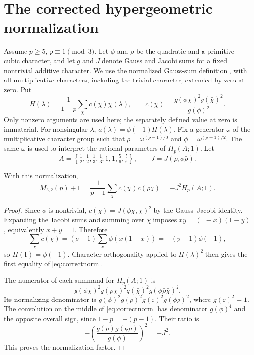 \section{The corrected hypergeometric normalization}\label{sec:hyp}
Assume $p\ge5$, $p\equiv1\pmod3$. Let $\phi$ and $\rho$ be the quadratic and a primitive cubic character, and let $g$ and $J$ denote Gauss and Jacobi sums for a fixed nontrivial additive character. We use the normalized Gauss-sum definition
\cite[Eq. (1.1)]{Grove}, with all multiplicative characters, including
the trivial character, extended by zero at zero. Put
\[
 H(\lambda)=\frac1{1-p}\sum_\chi c(\chi)\chi(\lambda),
 \qquad c(\chi)=\frac{g(\phi\chi)^2g(\bar\chi)^2}{g(\phi)^2}.
\]
Only nonzero arguments are used here; the separately defined value at zero is immaterial. For nonsingular $\lambda$, $a(\lambda)=\phi(-1)H(\lambda)$.
Fix a generator $\omega$ of the multiplicative character group such that $\rho=\omega^{(p-1)/3}$ and $\phi=\omega^{(p-1)/2}$. The same $\omega$ is used to interpret the rational parameters of $H_p(A;1)$. Let
\[
 A=\left\{\tfrac12,\tfrac12,\tfrac13,\tfrac13;
               1,1,\tfrac56,\tfrac56\right\},\qquad
 J=J(\rho,\phi\bar\rho).
\]
\begin{lemma}\label{lem:norm}
With this normalization,
\begin{equation}\label{eq:correctnorm}
 M_{3,2}(p)+1
 =\frac1{p-1}\sum_\chi c(\chi)c(\bar\rho\bar\chi)
 =-J^2 H_p(A;1).
\end{equation}
\end{lemma}
\begin{proof}
Since $\phi$ is nontrivial,
$c(\chi)=J(\phi\chi,\bar\chi)^2$ by the Gauss--Jacobi identity.
Expanding the Jacobi sums and summing over $\chi$ imposes
$xy=(1-x)(1-y)$, equivalently $x+y=1$. Therefore
\[
 \sum_\chi c(\chi)=(p-1)\sum_x\phi(x(1-x))
 =-(p-1)\phi(-1),
\]
so $H(1)=\phi(-1)$. Character orthogonality applied to $H(\lambda)^2$
then gives the first equality of \eqref{eq:correctnorm}.

The numerator of each summand for $H_p(A;1)$ is
\[
 g(\phi\chi)^2g(\rho\chi)^2g(\bar\chi)^2
                  g(\phi\bar\rho\bar\chi)^2.
\]
Its normalizing denominator is
$g(\phi)^2g(\rho)^2g(\varepsilon)^2g(\phi\bar\rho)^2$,
where $g(\varepsilon)^2=1$. The convolution on the middle of
\eqref{eq:correctnorm} has denominator $g(\phi)^4$ and the opposite
overall sign, since $1-p=-(p-1)$. Their ratio is
\[
 -\left(\frac{g(\rho)g(\phi\bar\rho)}{g(\phi)}\right)^2=-J^2.
\]
This proves the normalization factor.
\end{proof}

